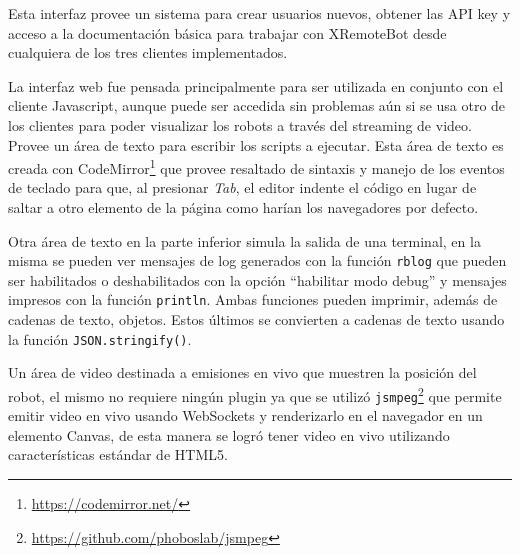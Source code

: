 Esta interfaz provee un sistema para crear usuarios nuevos, obtener las
API key y acceso a la documentación básica para trabajar con XRemoteBot
desde cualquiera de los tres clientes implementados.

La interfaz web fue pensada principalmente para ser utilizada en conjunto
 con el cliente
Javascript, aunque puede ser accedida sin problemas aún si se usa
otro de los clientes para poder visualizar los robots a través del
streaming de video. Provee un área de texto para escribir los scripts a
ejecutar.
Esta área de texto es creada con
CodeMirror\footnote{\url{https://codemirror.net/}}
que provee resaltado de sintaxis y manejo de los eventos de teclado para
que, al presionar \textit{Tab}, el editor indente el código en lugar de saltar a otro
elemento de la página como harían los navegadores por defecto.

Otra área de texto en la parte inferior
simula la salida de una terminal, en la misma
se pueden ver mensajes de log generados con la función
\texttt{rblog} que pueden ser habilitados o deshabilitados con la opción
``habilitar modo debug''
 y mensajes impresos con la función \texttt{println}.
Ambas funciones pueden imprimir, además de cadenas de texto, objetos. Estos últimos
se convierten a cadenas de texto usando la función \texttt{JSON.stringify()}.

Un área de video destinada a emisiones en vivo que muestren la posición
del robot, el mismo no requiere ningún plugin ya que se utilizó
\texttt{jsmpeg}\footnote{\url{https://github.com/phoboslab/jsmpeg}}
que permite emitir video en vivo usando WebSockets y renderizarlo
en el navegador en un elemento Canvas, de esta manera se logró tener
video en vivo utilizando características estándar de HTML5.
